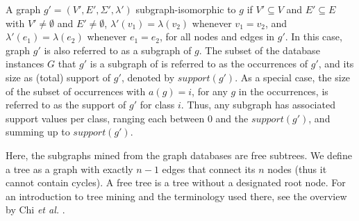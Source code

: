 \documentclass{sig-alternate}
\begin{document}
A graph $g'=(V',E',\Sigma',\lambda')$ subgraph-isomorphic to $g$ if $V'
\subseteq V$ and $E' \subseteq E$ with $V' \ne \emptyset$ and $E' \ne
\emptyset$, $\lambda'(v_1)=\lambda(v_2)$ whenever $v_1=v_2$, and
$\lambda'(e_1)=\lambda(e_2)$ whenever $e_1=e_2$, for all nodes and edges in
$g'$. In this case, graph $g'$ is also referred to as a subgraph of $g$. The subset of 
the database instances $G$ that $g'$ is a subgraph of is referred to as the occurrences of $g'$, 
and its size as (total) support of
$g'$, denoted by $support(g')$. As a special case, the size of the subset of occurrences with $a(g)=i$,
for any $g$ in the occurrences, is referred to as the support of $g'$ for class
$i$. Thus, any subgraph has associated support values per class, ranging each
between 0 and the $support(g')$, and summing up to $support(g')$.

Here, the subgraphs mined from the graph databases are free subtrees. We define a tree
as a graph with exactly $n-1$ edges that connect its $n$ nodes (thus it cannot contain cycles). A free tree is
a tree without a designated root node. For an introduction to tree mining and
the terminology used there, see the overview by Chi \emph{et al.}
\cite{CMNK01Frequent}.
\end{document}
